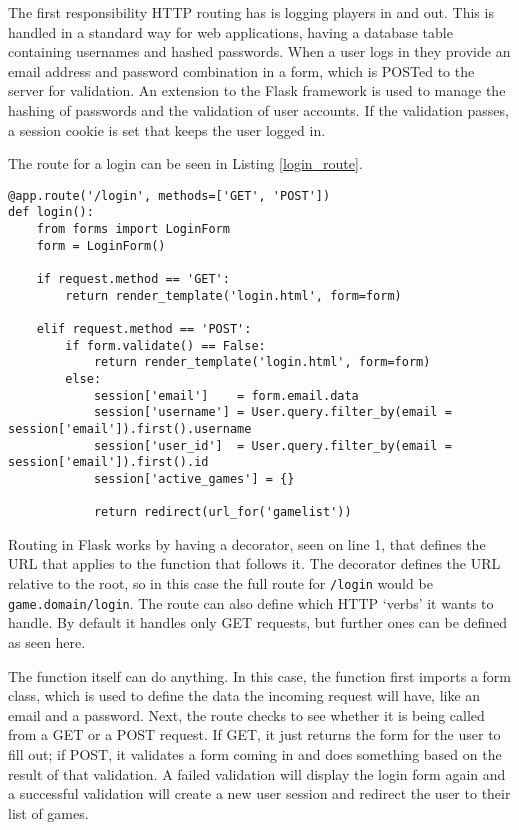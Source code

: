 The first responsibility HTTP routing has is logging players in and out. This is handled in a standard way for web applications, having a database table containing usernames and hashed passwords. When a user logs in they provide an email address and password combination in a form, which is POSTed to the server for validation. An extension to the Flask framework is used to manage the hashing of passwords and the validation of user accounts. If the validation passes, a session cookie is set that keeps the user logged in.

The route for a login can be seen in Listing \ref{login_route}.

\noindent
\begin{minipage}{\linewidth}
\begin{lstlisting}[style=py, caption={Route for handling logins on the server-side.}, label=login_route]
@app.route('/login', methods=['GET', 'POST'])
def login():
    from forms import LoginForm
    form = LoginForm()

    if request.method == 'GET':
        return render_template('login.html', form=form)

    elif request.method == 'POST':
        if form.validate() == False:
            return render_template('login.html', form=form)
        else:
            session['email']    = form.email.data
            session['username'] = User.query.filter_by(email = session['email']).first().username
            session['user_id']  = User.query.filter_by(email = session['email']).first().id
            session['active_games'] = {}

            return redirect(url_for('gamelist'))
\end{lstlisting}
\end{minipage}

Routing in Flask works by having a decorator, seen on line 1, that defines the URL that applies to the function that follows it. The decorator defines the URL relative to the root, so in this case the full route for \texttt{/login} would be \texttt{game.domain/login}. The route can also define which HTTP `verbs' it wants to handle. By default it handles only GET requests, but further ones can be defined as seen here.

The function itself can do anything. In this case, the function first imports a form class, which is used to define the data the incoming request will have, like an email and a password. Next, the route checks to see whether it is being called from a GET or a POST request. If GET, it just returns the form for the user to fill out; if POST, it validates a form coming in and does something based on the result of that validation. A failed validation will display the login form again and a successful validation will create a new user session and redirect the user to their list of games.

